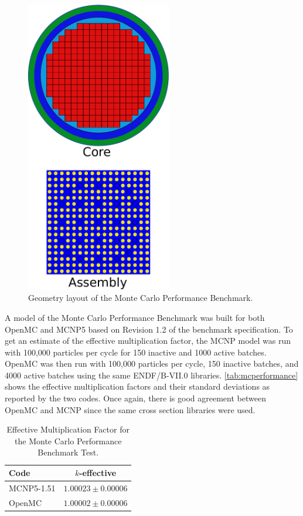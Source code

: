 \documentclass[authoryear,preprint]{elsarticle}
\begin{document}
\begin{figure}[!ht]
  \centering
  \includegraphics[width=2.5in]{mcperformance.pdf}
  \caption{Geometry layout of the Monte Carlo Performance Benchmark.}
  \label{fig:core}
\end{figure}

A model of the Monte Carlo Performance Benchmark was built for both OpenMC and
MCNP5 based on Revision 1.2 of the benchmark specification. To get an estimate
of the effective multiplication factor, the MCNP model was run with 100,000
particles per cycle for 150 inactive and 1000 active batches. OpenMC was then
run with 100,000 particles per cycle, 150 inactive batches, and 4000 active
batches using the same ENDF/B-VII.0 libraries. \autoref{tab:mcperformance} shows
the effective multiplication factors and their standard deviations as reported
by the two codes. Once again, there is good agreement between OpenMC and MCNP
since the same cross section libraries were used.

\begin{table}
  \caption{Effective Multiplication Factor for the Monte Carlo Performance
    Benchmark Test.}
  \label{tab:mcperformance}
  \begin{center}
  \begin{tabular}{ l c }
    \hline
    Code & $k$-effective \\
    \hline
    MCNP5-1.51 & $1.00023 \pm 0.00006$ \\
    OpenMC     & $1.00002 \pm 0.00006$ \\
    \hline
  \end{tabular}
  \end{center}
\end{table}
\end{document}
